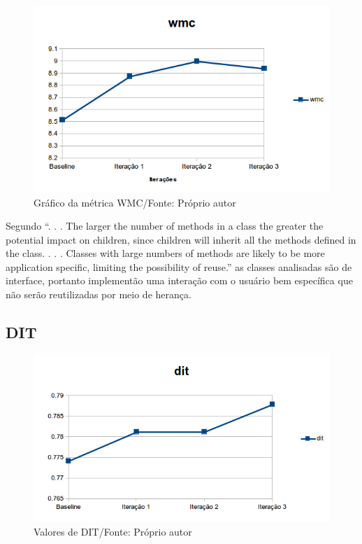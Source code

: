 \begin{figure}[h]
	\centering
	\includegraphics{img/wmc.png}
	\caption{Gráfico da métrica WMC/Fonte: Próprio autor} 
	\label{fig:wmc}
\end{figure}


Segundo  “. . . The larger the number of methods in
a class the greater the potential impact on children, since children will inherit all the
methods defined in the class. . . . Classes with large numbers of methods are likely to
be more application specific, limiting the possibility of reuse.” as classes analisadas
são de interface, portanto implementão uma interação com o usuário bem
específica que não serão reutilizadas por meio de herança.

\subsection{DIT}


\begin{figure}[h]
	\centering
	\includegraphics{img/dit.png}
	\caption{Valores de DIT/Fonte: Próprio autor}
	\label{fig:dit}
\end{figure}


